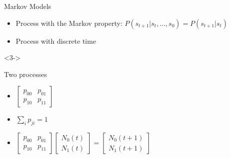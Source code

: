 \documentclass[english]{beamer} %
\begin{document}
\begin{frame}[<+->]{Markov Models}
\begin{itemize}
\item Process with the Markov property: $P(s_{t+1}|s_{t},...,s_{0})=P(s_{t+1}|s_{t})$
\item Process with discrete time\end{itemize}
\begin{uncoverenv}%
<3->
\begin{exampleblock}
{Two processes}
\begin{itemize}
\item $\left[\begin{array}{cc}
p_{00} & p_{01}\\
p_{10} & p_{11}\end{array}\right]$
\item $\sum_{i}p_{ji}=1$
\item  $\left[\begin{array}{cc}
p_{00} & p_{01}\\
p_{10} & p_{11}\end{array}\right]\left[\begin{array}{c}
N_{0}(t)\\
N_{1}(t)\end{array}\right]=\left[\begin{array}{c}
N_{0}(t+1)\\
N_{1}(t+1)\end{array}\right]$
\end{itemize}
\end{exampleblock}
\end{uncoverenv}%
\end{frame}
\end{document}
